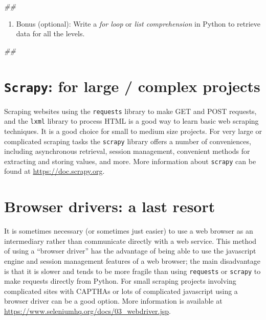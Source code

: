\documentclass[
]{book}
\newenvironment{Shaded}{\begin{snugshade}}{\end{snugshade}}
\newcommand{\CommentTok}[1]{\textcolor[rgb]{0.56,0.35,0.01}{\textit{#1}}}
\providecommand{\tightlist}{%
  \setlength{\itemsep}{0pt}\setlength{\parskip}{0pt}}
\begin{document}
\begin{Shaded}
\begin{Highlighting}[]
\CommentTok{##}
\end{Highlighting}
\end{Shaded}

\begin{enumerate}
\def\labelenumi{\arabic{enumi}.}
\setcounter{enumi}{3}
\tightlist
\item
  Bonus (optional): Write a \emph{for loop} or \emph{list comprehension} in Python
  to retrieve data for all the levels.
\end{enumerate}

\begin{Shaded}
\begin{Highlighting}[]
\CommentTok{##}
\end{Highlighting}
\end{Shaded}

\hypertarget{scrapy-for-large-complex-projects}{%
\section{\texorpdfstring{\texttt{Scrapy}: for large / complex projects}{Scrapy: for large / complex projects}}\label{scrapy-for-large-complex-projects}}

Scraping websites using the \texttt{requests} library to make GET and POST
requests, and the \texttt{lxml} library to process HTML is a good way to
learn basic web scraping techniques. It is a good choice for small to
medium size projects. For very large or complicated scraping tasks the
\texttt{scrapy} library offers a number of conveniences, including
asynchronous retrieval, session management, convenient methods for
extracting and storing values, and more. More information about
\texttt{scrapy} can be found at \url{https://doc.scrapy.org}.

\hypertarget{browser-drivers-a-last-resort}{%
\section{Browser drivers: a last resort}\label{browser-drivers-a-last-resort}}

It is sometimes necessary (or sometimes just easier) to use a web
browser as an intermediary rather than communicate directly with a
web service. This method of using a ``browser driver'' has the advantage
of being able to use the javascript engine and session management features
of a web browser; the main disadvantage is that it is slower and tends to
be more fragile than using \texttt{requests} or \texttt{scrapy} to make requests directly
from Python. For small scraping projects involving complicated sites
with CAPTHAs or lots of complicated javascript using a browser driver
can be a good option. More information is available at
\url{https://www.seleniumhq.org/docs/03_webdriver.jsp}.
\end{document}
